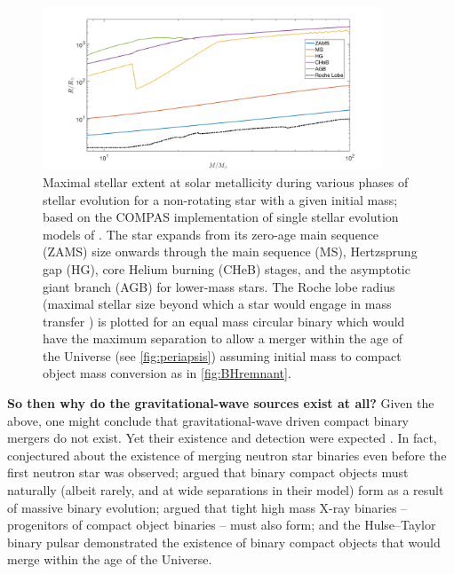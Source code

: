 \documentclass[iop,onecolumn]{revtex4}
\newcommand{\todo}[1]{\textcolor{red}{#1}}
\begin{document}
\begin{figure}
	\centering	
	\includegraphics[width=0.9\textwidth]{StellarRadiusZsolarRoche.png}
\caption{Maximal stellar extent at solar metallicity during various phases of stellar evolution for a non-rotating star with a given initial mass; based on the COMPAS implementation of single stellar evolution models of \citet{Hurley:2000}.   The star expands from its zero-age main sequence (ZAMS) size onwards through the main sequence (MS), Hertzsprung gap (HG), core Helium burning (CHeB) stages, and the asymptotic giant branch (AGB) for lower-mass stars.  The Roche lobe radius (maximal stellar size beyond which a star would engage in mass transfer \citep{Eggleton:1983}) is plotted for an equal mass circular binary which would have the maximum separation to allow a merger within the age of the Universe (see \autoref{fig:periapsis}) assuming initial mass to compact object mass conversion as in \autoref{fig:BHremnant}.\label{fig:Rmax} }
\end{figure}


\textbf{So then why do the gravitational-wave sources exist at all?} Given the above, one might conclude that gravitational-wave driven compact binary mergers do not exist. Yet their existence and detection were expected \citep{ratesdoc}. In fact, \citet{Dyson:1962} conjectured about the existence of merging neutron star binaries even before the first neutron star was observed; \citet{Tutukov:1973} argued that binary compact objects must naturally (albeit  rarely, and at wide separations in their model) form as a result of massive binary evolution; \citet{vdHDeLoore:1973} argued that tight high mass X-ray binaries -- progenitors of compact object binaries -- must also form; and the Hulse--Taylor binary pulsar \citep{HulseTaylor:1975} demonstrated the existence of binary compact objects that would merge within the age of the Universe.
\end{document}
